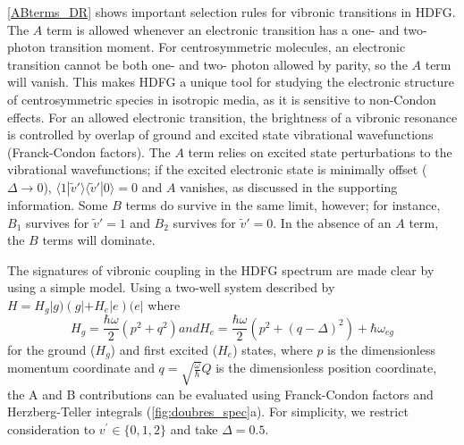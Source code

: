 \documentclass[aip, jcp, reprint, onecolumn, nofootinbib]{revtex4-2}
\begin{document}
\autoref{ABterms_DR} shows important selection rules for vibronic transitions in HDFG.
The $A$ term is allowed whenever an electronic transition has a one- and two- photon transition moment.
For centrosymmetric molecules, an electronic transition cannot be both one- and two- photon allowed by parity, so the $A$ term will vanish.
This makes HDFG a unique tool for studying the electronic structure of centrosymmetric species in isotropic media, as it is sensitive to non-Condon effects.\cite{Milojevich2011, Olson2018}
For an allowed electronic transition, the brightness of a vibronic resonance is controlled by overlap of ground and excited state vibrational wavefunctions (Franck-Condon factors).
The $A$ term relies on excited state perturbations to the vibrational wavefunctions; if the excited electronic state is minimally offset ($\Delta \rightarrow 0$), $\langle 1 | \tilde{v}' \rangle \langle \tilde{v}' | 0 \rangle = 0$ and $A$ vanishes, as discussed in the supporting information.
Some $B$ terms do survive in the same limit, however; for instance, $B_1$ survives for $\tilde{v}'=1$ and $B_2$ survives for $\tilde{v}'=0$.
In the absence of an $A$ term, the $B$ terms will dominate.

The signatures of vibronic coupling in the HDFG spectrum are made clear by using a simple model.
Using a two-well system described by $H = H_g |g) \left(g| + H_e |e\right) (e|$ where
\begin{subequations}\label{Hamiltonian}
	\begin{equation}
		H_g = \frac{\hbar \omega }{2} \left(p^2 + q^2 \right)
	\end{equation}
	and
	\begin{equation}
		H_e = \frac{\hbar \omega }{2} \left(p^2 +  (q-\Delta)^2 \right) + \hbar \omega_{eg}
	\end{equation}
\end{subequations}
for the ground ($H_g$) and first excited ($H_e$) states, where $p$ is the dimensionless momentum coordinate and $q = \sqrt{\frac{\omega}{\hbar}} Q$ is the dimensionless position coordinate, the A and B contributions can be evaluated using Franck-Condon factors and Herzberg-Teller integrals (\autoref{fig:doubres_spec}a).
For simplicity, we restrict consideration to $v^\prime \in \{0,1,2\}$ and take $\Delta = 0.5$.
\end{document}
